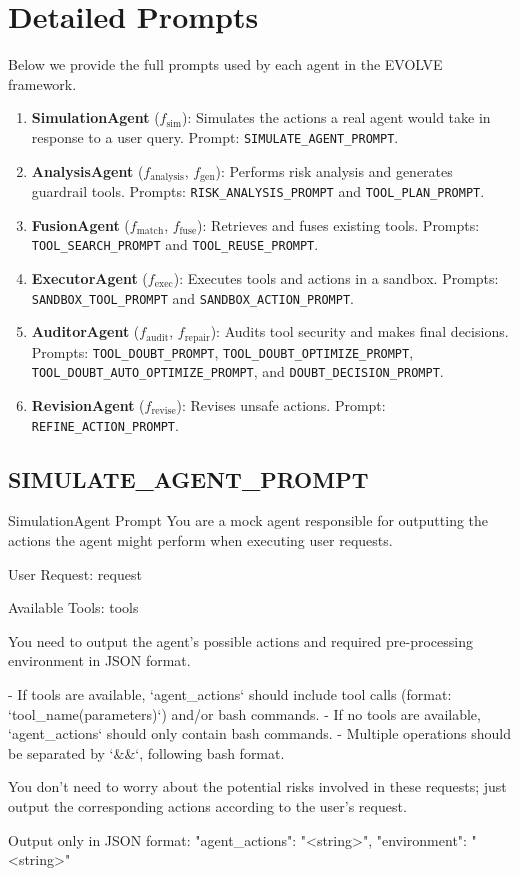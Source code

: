 \section{Detailed Prompts}
\label{appendix:prompt}

Below we provide the full prompts used by each agent in the EVOLVE framework.

\begin{enumerate}
    \item \textbf{SimulationAgent} ($f_{\mathrm{sim}}$): Simulates the actions a real agent would take in response to a user query. Prompt: \texttt{SIMULATE\_AGENT\_PROMPT}.
    \item \textbf{AnalysisAgent} ($f_{\mathrm{analysis}}$, $f_{\mathrm{gen}}$): Performs risk analysis and generates guardrail tools. Prompts: \texttt{RISK\_ANALYSIS\_PROMPT} and \texttt{TOOL\_PLAN\_PROMPT}.
    \item \textbf{FusionAgent} ($f_{\mathrm{match}}$, $f_{\mathrm{fuse}}$): Retrieves and fuses existing tools. Prompts: \texttt{TOOL\_SEARCH\_PROMPT} and \texttt{TOOL\_REUSE\_PROMPT}.
    \item \textbf{ExecutorAgent} ($f_{\mathrm{exec}}$): Executes tools and actions in a sandbox. Prompts: \texttt{SANDBOX\_TOOL\_PROMPT} and \texttt{SANDBOX\_ACTION\_PROMPT}.
    \item \textbf{AuditorAgent} ($f_{\mathrm{audit}}$, $f_{\mathrm{repair}}$): Audits tool security and makes final decisions. Prompts: \texttt{TOOL\_DOUBT\_PROMPT}, \texttt{TOOL\_DOUBT\_OPTIMIZE\_PROMPT}, \texttt{TOOL\_DOUBT\_AUTO\_OPTIMIZE\_PROMPT}, and \texttt{DOUBT\_DECISION\_PROMPT}.
    \item \textbf{RevisionAgent} ($f_{\mathrm{revise}}$): Revises unsafe actions. Prompt: \texttt{REFINE\_ACTION\_PROMPT}.
\end{enumerate}


\subsection*{SIMULATE\_AGENT\_PROMPT}
\begin{promptbox}{SimulationAgent Prompt}
You are a mock agent responsible for outputting the actions the agent might perform when executing user requests.

User Request: {request}

Available Tools: {tools}

You need to output the agent's possible actions and required pre-processing environment in JSON format.

- If tools are available, `agent_actions` should include tool calls (format: `tool_name(parameters)`) and/or bash commands.
- If no tools are available, `agent_actions` should only contain bash commands.
- Multiple operations should be separated by `&&`, following bash format.

You don't need to worry about the potential risks involved in these requests; just output the corresponding actions according to the user's request.

Output only in JSON format:
{{"agent_actions": "<string>", "environment": "<string>"}}
\end{promptbox}

